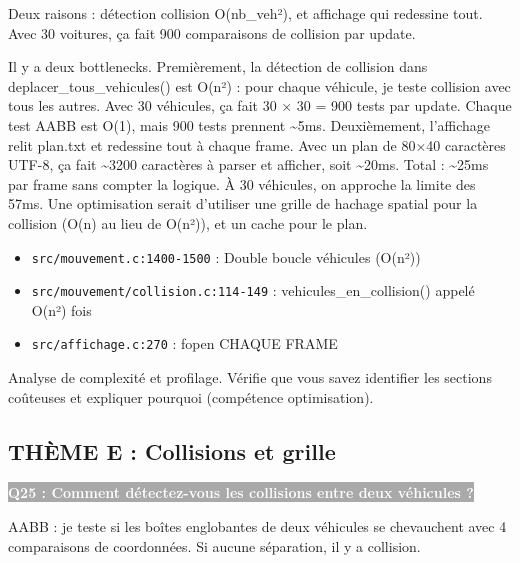 \documentclass[12pt,a4paper]{article}
\newcommand{\question}[1]{%
    \vspace{0.5cm}
    \noindent\colorbox{darkgray}{\textcolor{white}{\textbf{#1}}}
    \vspace{0.3cm}
}
\begin{document}
\begin{reponse_courte}
Deux raisons : détection collision O(nb\_veh²), et affichage qui redessine tout. Avec 30 voitures, ça fait 900 comparaisons de collision par update.
\end{reponse_courte}

\begin{reponse_longue}
Il y a deux bottlenecks. Premièrement, la détection de collision dans deplacer\_tous\_vehicules() est O(n²) : pour chaque véhicule, je teste collision avec tous les autres. Avec 30 véhicules, ça fait 30 × 30 = 900 tests par update. Chaque test AABB est O(1), mais 900 tests prennent \textasciitilde{}5ms. Deuxièmement, l'affichage relit plan.txt et redessine tout à chaque frame. Avec un plan de 80×40 caractères UTF-8, ça fait \textasciitilde{}3200 caractères à parser et afficher, soit \textasciitilde{}20ms. Total : \textasciitilde{}25ms par frame sans compter la logique. À 30 véhicules, on approche la limite des 57ms. Une optimisation serait d'utiliser une grille de hachage spatial pour la collision (O(n) au lieu de O(n²)), et un cache pour le plan.
\end{reponse_longue}

\begin{reference_code}
\begin{itemize}
    \item \texttt{src/mouvement.c:1400-1500} : Double boucle véhicules (O(n²))
    \item \texttt{src/mouvement/collision.c:114-149} : vehicules\_en\_collision() appelé O(n²) fois
    \item \texttt{src/affichage.c:270} : fopen CHAQUE FRAME
\end{itemize}
\end{reference_code}

\begin{objectif_prof}
Analyse de complexité et profilage. Vérifie que vous savez identifier les sections coûteuses et expliquer pourquoi (compétence optimisation).
\end{objectif_prof}

\subsection{THÈME E : Collisions et grille}

\question{Q25 : Comment détectez-vous les collisions entre deux véhicules ?}

\begin{reponse_courte}
AABB : je teste si les boîtes englobantes de deux véhicules se chevauchent avec 4 comparaisons de coordonnées. Si aucune séparation, il y a collision.
\end{reponse_courte}
\end{document}
